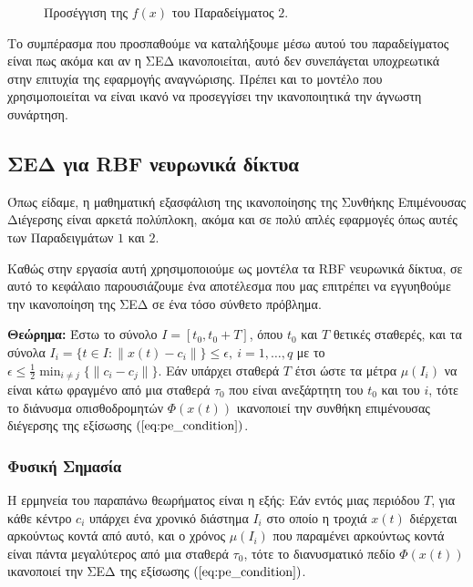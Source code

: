 \begin{figure}[h!]
\centering
\scalebox{.6}{}
\caption{ Προσέγγιση της $f(x)$ του Παραδείγματος $2$. }
\label{fig:sines_approximation}
\end{figure}

\pagebreak
Το συμπέρασμα που προσπαθούμε να καταλήξουμε μέσω αυτού του παραδείγματος είναι πως ακόμα και αν η ΣΕΔ ικανοποιείται, αυτό δεν συνεπάγεται υποχρεωτικά στην επιτυχία της εφαρμογής αναγνώρισης. Πρέπει και το μοντέλο που χρησιμοποιείται να είναι ικανό να προσεγγίσει την ικανοποιητικά την άγνωστη συνάρτηση.

\subsection{ΣΕΔ για RBF νευρωνικά δίκτυα} \label{subsec:rbf_PE}
Όπως είδαμε, η μαθηματική εξασφάλιση της ικανοποίησης της Συνθήκης Επιμένουσας Διέγερσης είναι αρκετά πολύπλοκη, ακόμα και σε πολύ απλές εφαρμογές όπως αυτές των Παραδειγμάτων $1$ και $2$. 

Καθώς στην εργασία αυτή χρησιμοποιούμε ως μοντέλα τα RBF νευρωνικά δίκτυα, σε αυτό το κεφάλαιο παρουσιάζουμε ένα αποτέλεσμα που μας επιτρέπει να εγγυηθούμε την ικανοποίηση της ΣΕΔ σε ένα τόσο σύνθετο πρόβλημα.

\textbf{Θεώρημα:} Έστω το σύνολο $I = [t_0, t_0 + T]$, όπου $t_0$ και $T$
θετικές σταθερές, και τα σύνολα $I_i = \{ t \in I :  \| x(t) - c_i \| \} \leq \epsilon, \: i = 1,\dots, q $ με το $\epsilon \leq \frac{1}{2} \min_{i \neq j} \{\| c_i - c_j \| \}$. Εάν υπάρχει σταθερά $T$ έτσι ώστε τα μέτρα $\mu(I_i)$ να είναι κάτω φραγμένο από μια σταθερά $\tau_0$ που είναι ανεξάρτητη του $t_0$ και του $i$, τότε το διάνυσμα οπισθοδρομητών $\varPhi(x(t))$ ικανοποιεί την συνθήκη επιμένουσας διέγερσης της εξίσωσης $(\ref{eq:pe_condition})$.

\subsubsection{Φυσική Σημασία}
Η ερμηνεία του παραπάνω θεωρήματος είναι η εξής: Εάν εντός μιας περιόδου $T$, για κάθε κέντρο $c_i$ υπάρχει ένα χρονικό διάστημα $I_i$ στο οποίο η τροχιά $x(t)$ διέρχεται αρκούντως κοντά από αυτό, και ο χρόνος $\mu (I_i)$ που παραμένει αρκούντως κοντά είναι πάντα μεγαλύτερος από μια σταθερά $\tau_0$, τότε το διανυσματικό πεδίο $\varPhi(x(t))$ ικανοποιεί την ΣΕΔ της εξίσωσης $(\ref{eq:pe_condition})$.

